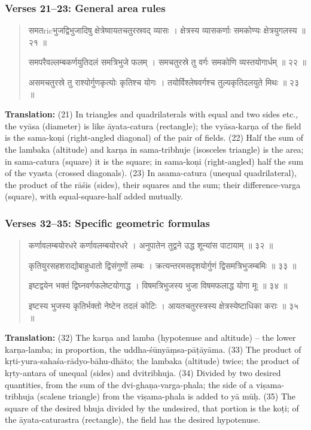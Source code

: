 \documentclass[11pt,a4paper]{article}
\newcommand{\dev}[1]{{\devanagarifont #1}}
\newenvironment{sanskritverse}{%
  \begin{quote}%
  \devanagarifont%
  \setlength{\leftmargin}{2em}%
}{\end{quote}}
\begin{document}
\subsubsection*{Verses 21--23: General area rules}

\begin{sanskritverse}
\dev{समतricभुजद्विभुजादिषु क्षेत्रेष्वायतचतुरस्रवद् व्यासः} ।
\dev{क्षेत्रस्य व्यासकर्णाः समकोण्यः क्षेत्रयुगलस्य ॥ २१ ॥}

\dev{समपरैवल्लम्बकर्णयुतिदलं समत्रिभुजे फलम्} ।
\dev{समचतुरस्रे तु वर्गः समकोणि व्यस्तयोगार्धम् ॥ २२ ॥}

\dev{असमचतुरस्रे तु राश्योर्गुणकृत्योः कृतिश्च योगः} ।
\dev{तयोर्विश्लेषवर्गश्च तुल्यकृतिदलयुते मिथः ॥ २३ ॥}
\end{sanskritverse}

\textbf{Translation:} (21) In triangles and quadrilaterals with equal and two sides 
etc., the vyāsa (diameter) is like āyata-catura (rectangle); the vyāsa-karṇa of 
the field is the sama-koṇi (right-angled diagonal) of the pair of fields. (22) 
Half the sum of the lambaka (altitude) and karṇa in sama-tribhuje (isosceles 
triangle) is the area; in sama-catura (square) it is the square; in sama-koṇi 
(right-angled) half the sum of the vyasta (crossed diagonals). (23) In asama-catura 
(unequal quadrilateral), the product of the rāśis (sides), their squares and the 
sum; their difference-varga (square), with equal-square-half added mutually.

\subsubsection*{Verses 32--35: Specific geometric formulas}

\begin{sanskritverse}
\dev{कर्णावलम्बयोरधरे कर्णावलम्बयोरधरे} ।
\dev{अनुपातेन तुद्वने उद्ध शून्यांस पाटायाम् ॥ ३२ ॥}

\dev{कृतियुरसहशराद्योबाहुधातो द्विसंगुणों लम्बः} ।
\dev{क्रत्यन्तरमसदृशयोर्गुणं द्विसमत्रिभुजम्बमिः ॥ ३३ ॥}

\dev{इष्टद्वयेन भक्तं द्विघ्नवर्गफलेष्टयोगाद्ध} ।
\dev{विषमत्रिभुजस्य भुजा विषमफलाद्ध योगा मूः ॥ ३४ ॥}

\dev{इष्टस्य भुजस्य कृतिर्भक्तो नेष्टेन तदलं कोटिः} ।
\dev{आयतचतुरस्त्रस्य क्षेत्रस्येष्टाधिका कराः ॥ ३५ ॥}
\end{sanskritverse}

\textbf{Translation:} (32) The karṇa and lamba (hypotenuse and altitude) -- the lower 
karṇa-lamba; in proportion, the uddha-śūnyāṃsa-pāṭāyāma. (33) The product of 
kṛti-yura-sahaśa-rādyo-bāhu-dhāto; the lambaka (altitude) twice; the product of 
kṛty-antara of unequal (sides) and dvitribhuja. (34) Divided by two desired quantities, 
from the sum of the dvi-ghaṇa-varga-phala; the side of a viṣama-tribhuja (scalene 
triangle) from the viṣama-phala is added to yā mūḥ. (35) The square of the desired 
bhuja divided by the undesired, that portion is the koṭi; of the āyata-caturastra 
(rectangle), the field has the desired hypotenuse.
\end{document}
